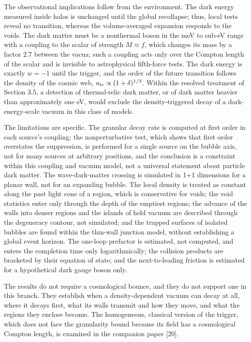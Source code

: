 \documentclass[preprint,12pt]{elsarticle}
\begin{document}
The observational implications follow from the environment. The dark energy measured inside halos is unchanged until the global recollapse; thus, local tests reveal no transition, whereas the volume-averaged expansion responds to the voids. The dark matter must be a nonthermal boson in the meV to sub-eV range with a coupling to the scalar of strength $M\approx f$, which changes its mass by a factor 2.7 between the vacua; such a coupling acts only over the Compton length of the scalar and is invisible to astrophysical fifth-force tests. The dark energy is exactly $w=-1$ until the trigger, and the order of the future transition follows the density of the cosmic web, $a_{\rm tr}\propto(1+\delta)^{1/3}$. Within the resolved treatment of Section 3.5, a detection of thermal-relic dark matter, or of dark matter heavier than approximately one eV, would exclude the density-triggered decay of a dark-energy-scale vacuum in this class of models.

The limitations are specific. The granular decay rate is computed at first order in each source's coupling; the nonperturbative test, which shows that first order overstates the suppression, is performed for a single source on the bubble axis, not for many sources at arbitrary positions, and the conclusion is a constraint within this coupling and vacuum model, not a universal statement about particle dark matter. The wave-dark-matter crossing is simulated in 1+1 dimensions for a planar wall, not for an expanding bubble. The local density is treated as constant along the past light cone of a region, which is conservative for voids; the void statistics enter only through the depth of the emptiest regions; the advance of the walls into denser regions and the islands of held vacuum are described through the degeneracy contour, not simulated; and the trapped surfaces of isolated bubbles are found within the thin-wall junction model, without establishing a global event horizon. The one-loop prefactor is estimated, not computed, and enters the completion time only logarithmically; the collision products are bracketed by their equation of state; and the next-to-leading friction is estimated for a hypothetical dark gauge boson only.

The results do not require a cosmological bounce, and they do not support one in this branch. They establish when a density-dependent vacuum can decay at all, where it decays first, what its walls transmit and how they move, and what the regions they enclose become. The homogeneous, classical version of the trigger, which does not face the granularity bound because its field has a cosmological Compton length, is examined in the companion paper [20].
\end{document}
